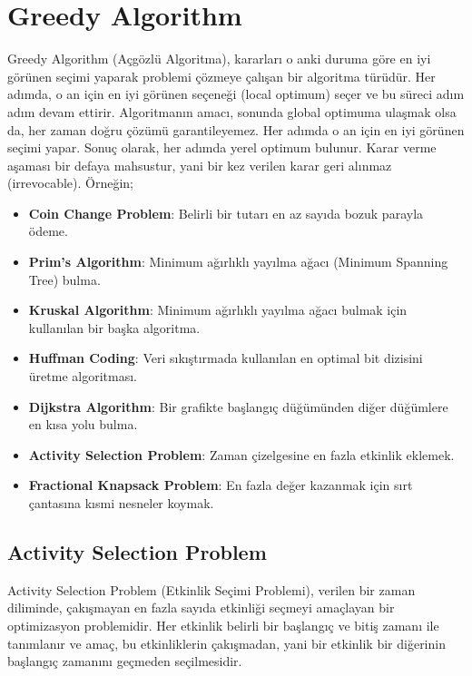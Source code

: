 \section{Greedy Algorithm}

Greedy Algorithm (Açgözlü Algoritma), kararları o anki duruma göre en iyi görünen seçimi yaparak problemi çözmeye çalışan bir algoritma türüdür. Her adımda, o an için en iyi görünen seçeneği (local optimum) seçer ve bu süreci adım adım devam ettirir. Algoritmanın amacı, sonunda global optimuma ulaşmak olsa da, her zaman doğru çözümü garantileyemez. Her adımda o an için en iyi görünen seçimi yapar. Sonuç olarak, her adımda yerel optimum bulunur. Karar verme aşaması bir defaya mahsustur, yani bir kez verilen karar geri alınmaz (irrevocable). Örneğin;

\begin{itemize}
    \item \textbf{Coin Change Problem}: Belirli bir tutarı en az sayıda bozuk parayla ödeme.
    \item \textbf{Prim's Algorithm}: Minimum ağırlıklı yayılma ağacı (Minimum Spanning Tree) bulma.
    \item \textbf{Kruskal Algorithm}: Minimum ağırlıklı yayılma ağacı bulmak için kullanılan bir başka algoritma.
    \item \textbf{Huffman Coding}: Veri sıkıştırmada kullanılan en optimal bit dizisini üretme algoritması.
    \item \textbf{Dijkstra Algorithm}: Bir grafikte başlangıç düğümünden diğer düğümlere en kısa yolu bulma.
    \item \textbf{Activity Selection Problem}: Zaman çizelgesine en fazla etkinlik eklemek.
    \item \textbf{Fractional Knapsack Problem}: En fazla değer kazanmak için sırt çantasına kısmi nesneler koymak.
\end{itemize}

\newpage

\subsection{Activity Selection Problem}

Activity Selection Problem (Etkinlik Seçimi Problemi), verilen bir zaman diliminde, çakışmayan en fazla sayıda etkinliği seçmeyi amaçlayan bir optimizasyon problemidir. Her etkinlik belirli bir başlangıç ve bitiş zamanı ile tanımlanır ve amaç, bu etkinliklerin çakışmadan, yani bir etkinlik bir diğerinin başlangıç zamanını geçmeden seçilmesidir.

